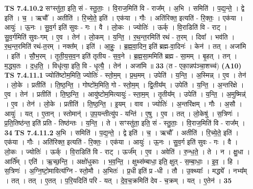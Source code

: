 \documentclass[17pt]{extarticle}
\begin{document}
                  \newline
                                \textbf{ TS 7.4.10.2} \newline
                  सꣳस्तु॑ता॒ इति॒ सं - स्तु॒ताः॒ । वि॒राज॒मिति॑ वि - राज᳚म् । अ॒भि । समिति॑ । प॒द्य॒न्ते॒ । द्वे इति॑ । च॒ । ऋचौ᳚ । अतीति॑ । रि॒च्ये॒ते॒ इति॑ । एक॑या । गौः । अति॑रिक्त॒ इत्यति॑ - रि॒क्तः॒ । एक॑या । आयुः॑ । ऊ॒नः । सु॒व॒र्ग इति॑ सुवः - गः । वै । लो॒कः । ज्योतिः॑ । ऊर्क् । वि॒राडिति॑ वि - राट् । सु॒व॒र्गमिति॑ सुवः-गम् । ए॒व । तेन॑ । लो॒कम् । य॒न्ति॒ । र॒थ॒न्त॒रमिति॑ रथं - त॒रम् । दिवा᳚ । भव॑ति । र॒थ॒न्त॒रमिति॑ रथं-त॒रम् । नक्त᳚म् । इति॑ । आ॒हुः॒ । ब्र॒ह्म॒वा॒दिन॒ इति॑ ब्रह्म-वा॒दिनः॑ । केन॑ । तत् । अजा॑मि । इति॑ । सौ॒भ॒रम् । तृ॒ती॒य॒स॒व॒न इति॑ तृतीय - स॒व॒ने । ब्र॒ह्म॒सा॒ममिति॑ ब्रह्म - सा॒मम् । बृ॒हत् । तन् । म॒द्ध्य॒तः । द॒ध॒ति॒ । विधृ॑त्या॒ इति॒ वि - धृ॒त्यै॒ । तेन॑ । अजा॑मि ॥ \textbf{  33} \newline
                  \newline
                      (त - एका॒न्नप॑ञ्चा॒शच्च॑)  \textbf{(A10)} \newline \newline
                                \textbf{ TS 7.4.11.1} \newline
                  ज्योति॑ष्टोम॒मिति॒ ज्योतिः॑ - स्तो॒म॒म् । प्र॒थ॒मम् । उपेति॑ । य॒न्ति॒ । अ॒स्मिन्न् । ए॒व । तेन॑ । लो॒के । प्रतीति॑ । ति॒ष्ठ॒न्ति॒ । गोष्टो॑म॒मिति॒ गो - स्तो॒म॒म् । द्वि॒तीय᳚म् । उपेति॑ । य॒न्ति॒ । अ॒न्तरि॑क्षे । ए॒व । तेन॑ । प्रतीति॑ । ति॒ष्ठ॒न्ति॒ । आयु॑ष्टोम॒मित्यायुः॑ - स्ता॒म॒म् । तृ॒तीय᳚म् । उपेति॑ । य॒न्ति॒ । अ॒मुष्मिन्न्॑ । ए॒व । तेन॑ । लो॒के । प्रतीति॑ । ति॒ष्ठ॒न्ति॒ । इ॒यम् । वाव । ज्योतिः॑ । अ॒न्तरि॑क्षम् । गौः । अ॒सौ । आयुः॑ । यत् । ए॒तान् । स्तोमान्॑ । उ॒प॒यन्तीत्यु॑प - यन्ति॑ । ए॒षु । ए॒व । तत् । लो॒केषु॑ । स॒त्रिणः॑ । प्र॒ति॒तिष्ठ॑न्त॒ इति॑ प्रति - तिष्ठ॑न्तः । य॒न्ति॒ । ते । सꣳस्तु॑ता॒ इति॒ सं - स्तु॒ताः॒ । वि॒राज॒मिति॑ वि - राज᳚म् । \textbf{  34} \newline
                  \newline
                                \textbf{ TS 7.4.11.2} \newline
                  अ॒भि । समिति॑ । प॒द्य॒न्ते॒ । द्वे इति॑ । च॒ । ऋचौ᳚ । अतीति॑ । रि॒च्ये॒ते॒ इति॑ । एक॑या । गौः । अति॑रिक्त॒ इत्यति॑ - रि॒क्तः॒ । एक॑या । आयुः॑ । ऊ॒नः । सु॒व॒र्ग इति॑ सुवः - गः । वै । लो॒कः । ज्योतिः॑ । ऊर्क् । वि॒राडिति॑ वि - राट् । ऊर्ज᳚म् । ए॒व । अवेति॑ । रु॒न्ध॒ते॒ । ते । न । क्षु॒धा । आर्ति᳚म् । एति॑ । ऋ॒च्छ॒न्ति॒ । अक्षो॑धुकाः । भ॒व॒न्ति॒ । क्षुथ्स॑म्बाधा॒ इति॒ क्षुत् - स॒म्बा॒धाः॒ । इ॒व॒ । हि । स॒त्रिणः॑ । अ॒ग्नि॒ष्टो॒मावित्य॑ग्नि - स्तो॒मौ । अ॒भितः॑ । प्र॒धी इति॑ प्र -धी । तौ । उ॒क्थ्याः᳚ । मद्ध्ये᳚ । नभ्य᳚म् । तत् । तत् । ए॒तत् । प॒रि॒यदिति॑ परि - यत् । दे॒व॒च॒क्रमिति॑ देव - च॒क्रम् । यत् । ए॒तेन॑ । \textbf{  35} \newline
\end{document}
